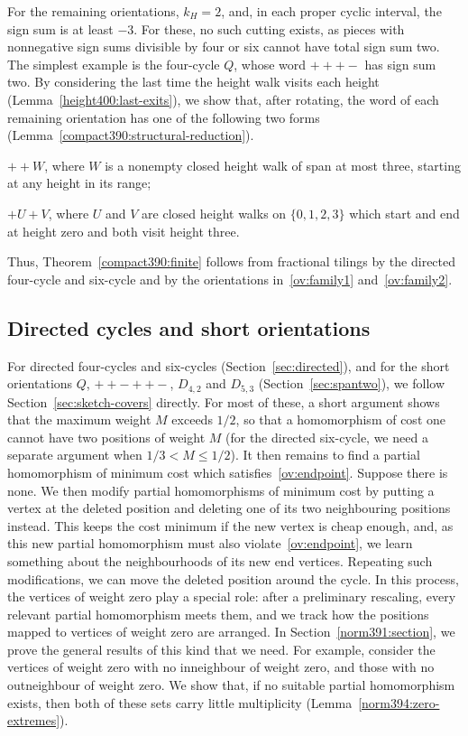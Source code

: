 For the remaining orientations, $k_H=2$, and, in each proper cyclic interval, the sign sum is at least $-3$. For these, no such cutting exists, as pieces with nonnegative sign sums divisible by four or six cannot have total sign sum two. The simplest example is the four-cycle $Q$, whose word $+++-$ has sign sum two.
By considering the last time the height walk visits each height (Lemma~\ref{height400:last-exits}), we show that, after rotating, the word of each remaining orientation has one of the following two forms (Lemma~\ref{compact390:structural-reduction}).
\begin{props}
\item $++W$, where $W$ is a nonempty closed height walk of span at most three, starting at any height in its range;\label{ov:family1}
\item $+U+V$, where $U$ and $V$ are closed height walks on $\{0,1,2,3\}$ which start and end at height zero and both visit height three.\label{ov:family2}
\end{props}
Thus, Theorem~\ref{compact390:finite} follows from fractional tilings by the directed four-cycle and six-cycle and by the orientations in~\ref{ov:family1} and~\ref{ov:family2}.

\subsection{Directed cycles and short orientations}\label{sec:sketch-small}
For directed four-cycles and six-cycles (Section~\ref{sec:directed}), and for the short orientations $Q$, $++-++-$, $D_{4,2}$ and $D_{5,3}$ (Section~\ref{sec:spantwo}), we follow Section~\ref{sec:sketch-covers} directly. For most of these, a short argument shows that the maximum weight $M$ exceeds $1/2$, so that a homomorphism of cost one cannot have two positions of weight $M$ (for the directed six-cycle, we need a separate argument when $1/3<M\le 1/2$). It then remains to find a partial homomorphism of minimum cost which satisfies~\eqref{ov:endpoint}.
Suppose there is none. We then modify partial homomorphisms of minimum cost by putting a vertex at the deleted position and deleting one of its two neighbouring positions instead. This keeps the cost minimum if the new vertex is cheap enough, and, as this new partial homomorphism must also violate~\eqref{ov:endpoint}, we learn something about the neighbourhoods of its new end vertices.
Repeating such modifications, we can move the deleted position around the cycle. In this process, the vertices of weight zero play a special role: after a preliminary rescaling, every relevant partial homomorphism meets them, and we track how the positions mapped to vertices of weight zero are arranged.
In Section~\ref{norm391:section}, we prove the general results of this kind that we need. For example, consider the vertices of weight zero with no inneighbour of weight zero, and those with no outneighbour of weight zero. We show that, if no suitable partial homomorphism exists, then both of these sets carry little multiplicity (Lemma~\ref{norm394:zero-extremes}).

